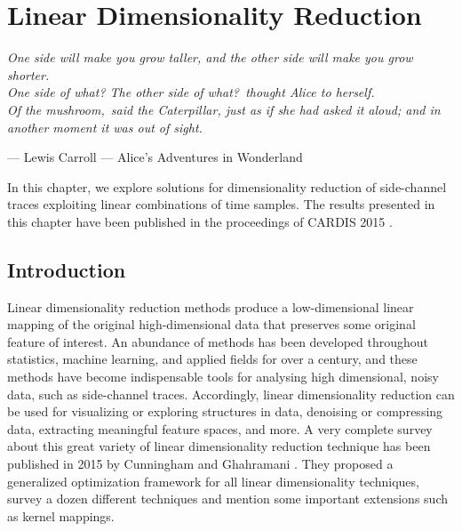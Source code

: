 
\chapter{Linear Dimensionality Reduction} 
\label{ChapterLinear}
\setlength{\epigraphwidth}{0.7\textwidth}
\epigraph{\textit{\textquotedbl One side will make you grow taller, and the
other side will make you grow shorter.\textquotedbl \\
\textquotedbl One side of what? The other side of what?\textquotedbl \ thought Alice to herself.\\
\textquotedbl Of the mushroom,\textquotedbl \ said the Caterpillar, just as if she had asked it aloud; and
in another moment it was out of sight.}}{--- \textup{Lewis Carroll --- \textquotedbl Alice's Adventures in Wonderland\textquotedbl}}


In this chapter, we explore solutions for dimensionality reduction of side-channel traces exploiting linear combinations of time samples. The results presented in this chapter have been published in the proceedings of CARDIS 2015 \cite{Cagli2016}.

\section{Introduction}\label{sec:intro_chapter_linear}
Linear dimensionality reduction methods produce a low-dimensional linear mapping of the original high-dimensional data that preserves some original feature of interest. An abundance of methods has been developed throughout statistics, machine learning, and applied fields for over a century, and these methods have become indispensable tools for analysing high dimensional, noisy data, such as side-channel traces.  Accordingly, linear dimensionality reduction can be used for visualizing or exploring structures in data, denoising or compressing data, extracting meaningful feature spaces, and more. A very complete survey about this great variety of linear dimensionality reduction technique has been published in 2015 by Cunningham and Ghahramani \cite{cunningham2015linear}. They proposed a generalized optimization framework for all linear dimensionality techniques, survey a dozen different techniques and mention some important extensions such as kernel mappings. \\

